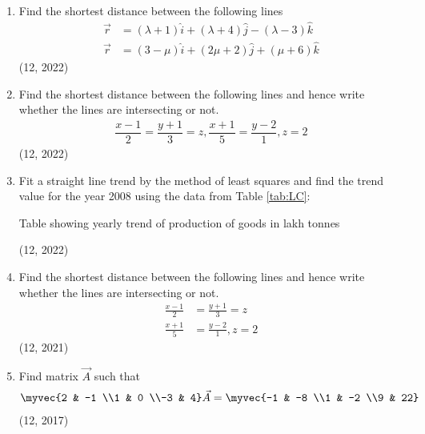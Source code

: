 \begin{enumerate}[label=\thesubsection.\arabic*,ref=\thesubsection.\theenumi]
\item Find the shortest distance between the following lines
	\begin{align}
		\vec{r}&=(\lambda+1)\hat{i}+(\lambda+4)\hat{j}-(\lambda-3)\hat{k}\\
		\vec{r}&=(3-\mu)\hat{i}+(2\mu+2)\hat{j}+(\mu+6)\hat{k}
	\end{align}
\hfill (12, 2022)

\item Find the shortest distance between the following lines and hence write whether the lines are intersecting or not.
	\begin{align}
		\dfrac{x-1}{2}=\dfrac{y+1}{3}=z, \dfrac{x+1}{5}=\dfrac{y-2}{1}, z=2
	\end{align}
\hfill (12, 2022)
\item Fit a straight line trend by the method of least squares and find the trend value for the year 2008 using the data from Table \ref{tab:LC}:
	\begin{table}[H]
		\caption{Table showing yearly trend of production of goods in lakh tonnes \label{tab:LC}}
		
	\end{table}
\hfill (12, 2022)
\item Find the shortest distance between the following lines and hence write
whether the lines are intersecting or not.
\begin{align}
  \frac{x-1}{2} &= \frac{y+1}{3} = z \\
  \frac{x+1}{5} &=\frac{y-2}{1},z=2
\end{align}
\hfill (12, 2021)
\item Find matrix $\vec{A}$ such that
\begin{align*}
   \myvec{2 & -1 \\1 & 0 \\-3 & 4} \vec{A}=\myvec{-1 & -8 \\1 & -2 \\9 & 22} 
\end{align*} 
\hfill (12, 2017)

\end{enumerate}
